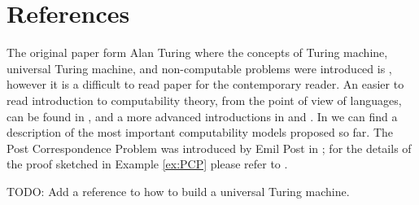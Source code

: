 %
%

\section*{References}

The original paper form Alan Turing where the concepts of Turing machine, universal Turing machine, and non-computable problems were introduced is \cite{turing1936computable}, however it is a difficult to read paper for the contemporary reader. An easier to read introduction to computability theory, from the point of view of languages, can be found in \cite{sipser2012introduction}, and a more advanced introductions in \cite{cooper2003computability} and \cite{soare2016turing}. In \cite{fernandez2009models} we can find a description of the most important computability models proposed so far. The Post Correspondence Problem was introduced by Emil Post in \cite{post1946variant}; for the details of the proof sketched in Example \ref{ex:PCP} please refer to \cite{sipser2012introduction}.

{\color{red} TODO: Add a reference to how to build a universal Turing machine.}

